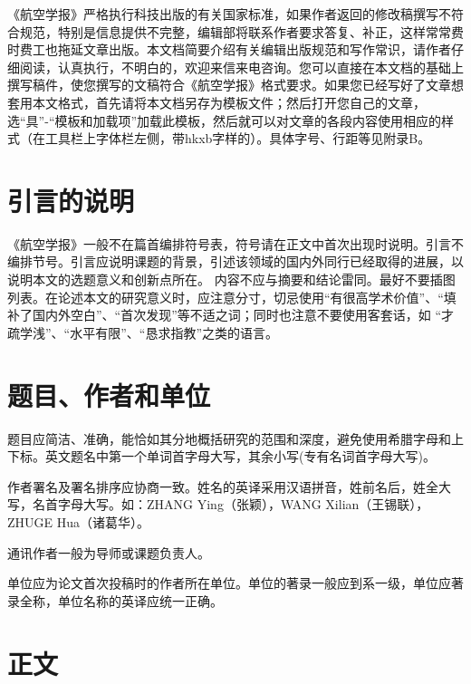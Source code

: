 \documentclass[10.5pt,twocolumn]{aaas}
\begin{document}

《航空学报》\enlargethispage{-3.0cm}严格执行科技出版的有关国家标准，如果作者返回的修改稿撰写不符合规范，特别是信息提供不完整，编辑部将联系作者要求答复、补正，这样常常费时费工也拖延文章出版。本文档简要介绍有关编辑出版规范和写作常识，请作者仔细阅读，认真执行，不明白的，欢迎来信来电咨询。您可以直接在本文档的基础上撰写稿件，使您撰写的文稿符合《航空学报》格式要求。如果您已经写好了文章想套用本文格式，首先请将本文档另存为模板文件；然后打开您自己的文章，选“具”-“模板和加载项”加载此模板，然后就可以对文章的各段内容使用相应的样式（在工具栏上字体栏左侧，带hkxb字样的）。具体字号、行距等见附录B。\enlargethispage{-3.0cm}

\section{引言的说明}
《航空学报》一般不在篇首编排符号表，符号请在正文中首次出现时说明。引言不编排节号。引言应说明课题的背景，引述该领域的国内外同行已经取得的进展，以说明本文的选题意义和创新点所在。 内容不应与摘要和结论雷同。最好不要插图列表。在论述本文的研究意义时，应注意分寸，切忌使用“有很高学术价值”、“填补了国内外空白”、“首次发现”等不适之词；同时也注意不要使用客套话，如 “才疏学浅”、“水平有限”、“恳求指教”之类的语言。

\section{题目、作者和单位}

题目应简洁、准确，能恰如其分地概括研究的范围和深度，避免使用希腊字母和上下标。英文题名中第一个单词首字母大写，其余小写(专有名词首字母大写)。

作者署名及署名排序应协商一致。姓名的英译采用汉语拼音，姓前名后，姓全大写，名首字母大写。如：ZHANG Ying（张颖），WANG Xilian（王锡联），ZHUGE Hua（诸葛华）。

通讯作者一般为导师或课题负责人。

单位应为论文首次投稿时的作者所在单位。单位的著录一般应到系一级，单位应著录全称，单位名称的英译应统一正确。

\section{正文}
\end{document}
